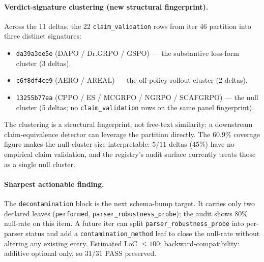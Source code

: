 \paragraph{Verdict-signature clustering (new structural fingerprint).}
Across the 11 deltas, the 22 \texttt{claim\_validation} rows from
iter 46 partition into three distinct signatures:
\begin{itemize}
\item \texttt{da39a3ee5e} (DAPO / Dr.GRPO / GSPO) --- the substantive
loss-form cluster (3 deltas).
\item \texttt{c6f8df4ce9} (AERO / AREAL) --- the off-policy-rollout
cluster (2 deltas).
\item \texttt{13255b77ea} (CPPO / ES / MCGRPO / NGRPO / SCAFGRPO) ---
the null cluster (5 deltas; no \texttt{claim\_validation} rows on the
same panel fingerprint).
\end{itemize}
The clustering is a structural fingerprint, not free-text similarity:
a downstream claim-equivalence detector can leverage the partition
directly. The 60.9\% coverage figure makes the null-cluster size
interpretable: $5/11$ deltas ($45\%$) have no empirical claim
validation, and the registry's audit surface currently treats those as
a single null cluster.

\paragraph{Sharpest actionable finding.}
The \texttt{decontamination} block is the next schema-bump target.
It carries only two declared leaves (\texttt{performed},
\texttt{parser\_robustness\_probe}); the audit shows $80\%$ null-rate
on this item. A future iter can split
\texttt{parser\_robustness\_probe} into per-parser status and add a
\texttt{contamination\_method} leaf to close the null-rate without
altering any existing entry. Estimated LoC $\leq 100$;
backward-compatibility: additive optional only, so $31/31$ PASS
preserved.

